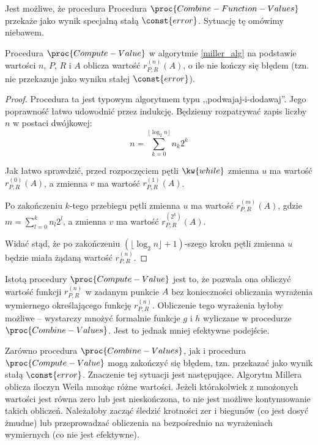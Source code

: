\begin{remark}
Jest możliwe, że procedura Procedura $\proc{Combine-Function-Values}$
przekaże jako wynik specjalną stałą $\const{error}$.
Sytuację tę omówimy niebawem.
\end{remark}

\begin{lemma}\label{compute_value_correct_lemma}
Procedura $\proc{Compute-Value}$ w algorytmie \ref{miller_alg}
na podstawie wartości
$n$, $P$, $R$ i $A$
oblicza
wartość $r_{P,R}^{(n)}(A)$,
o ile nie kończy się błędem
(tzn. nie przekazuje jako wyniku stałej $\const{error}$).
\end{lemma}

\begin{proof}
Procedura ta jest typowym algorytmem typu ,,podwajaj-i-dodawaj''.
Jego poprawność łatwo udowodnić przez indukcję.
Będziemy rozpatrywać zapis liczby $n$ w postaci dwójkowej:
\begin{equation*}
n = \sum_{k = 0}^{\lfloor\log_2 n\rfloor} n_k2^k
\end{equation*}

Jak łatwo sprawdzić,
przed rozpoczęciem pętli $\kw{while}$
zmienna $u$ ma wartość $r_{P,R}^{(0)}(A)$,
a zmienna $v$ ma wartość $r_{P,R}^{(1)}(A)$.

Po zakończeniu $k$-tego przebiegu pętli
zmienna $u$ ma wartość $r_{P,R}^{(m)}(A)$,
gdzie $m = \sum_{l=0}^k n_l2^l$,
a zmienna $v$ ma wartość $r_{P,R}^{(2^k)}(A)$.

Widać stąd, że po zakończeniu $(\lfloor\log_2 n\rfloor+1)$-szego kroku pętli
zmienna $u$ będzie miała żądaną wartość $r_{P,R}^{(n)}$.
\end{proof}

\begin{remark}
Istotą procedury $\proc{Compute-Value}$ jest to,
że pozwala ona obliczyć wartość funkcji $r_{P,R}^{(n)}$ w zadanym punkcie $A$
bez konieczności obliczania wyrażenia wymiernego
określającego funkcję $r_{P,R}^{(n)}$.
Obliczenie tego wyrażenia byłoby możliwe --
wystarczy mnożyć formalnie funkcje $g$ i $h$
wyliczane w procedurze $\proc{Combine-Values}$.
Jest to jednak mniej efektywne podejście.
\end{remark}

\begin{remark}
Zarówno procedura $\proc{Combine-Values}$,
jak i procedura $\proc{Compute-Value}$
mogą zakończyć się błędem, tzn. przekazać jako wynik stałą $\const{error}$.
Znaczenie tej sytuacji jest następujące.
Algorytm Millera oblicza iloczyn Weila mnożąc różne wartości.
Jeżeli którakolwiek z mnożonych wartości jest równa zero lub jest nieskończona,
to nie jest możliwe kontynuowanie takich obliczeń.
Należałoby zacząć śledzić krotności zer i biegunów
(co jest dosyć żmudne)
lub przeprowadzać obliczenia na bezpośrednio na wyrażeniach wymiernych
(co nie jest efektywne).
\end{remark}

